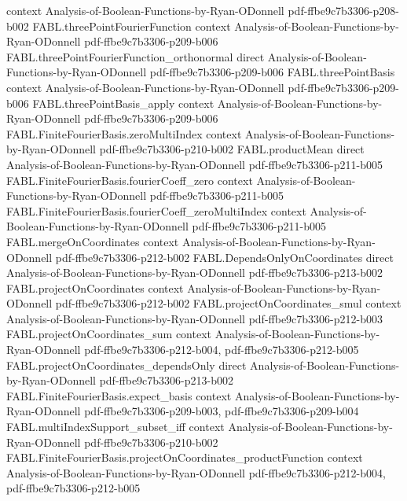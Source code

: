 \begin{theorem}
  {context}
  {Analysis-of-Boolean-Functions-by-Ryan-ODonnell}
  {pdf-ffbe9c7b3306-p208-b002}
\proofstep
  {FABL.threePointFourierFunction}
  {context}
  {Analysis-of-Boolean-Functions-by-Ryan-ODonnell}
  {pdf-ffbe9c7b3306-p209-b006}
\proofstep
  {FABL.threePointFourierFunction_orthonormal}
  {direct}
  {Analysis-of-Boolean-Functions-by-Ryan-ODonnell}
  {pdf-ffbe9c7b3306-p209-b006}
\proofstep
  {FABL.threePointBasis}
  {context}
  {Analysis-of-Boolean-Functions-by-Ryan-ODonnell}
  {pdf-ffbe9c7b3306-p209-b006}
\proofstep
  {FABL.threePointBasis_apply}
  {context}
  {Analysis-of-Boolean-Functions-by-Ryan-ODonnell}
  {pdf-ffbe9c7b3306-p209-b006}
\proofstep
  {FABL.FiniteFourierBasis.zeroMultiIndex}
  {context}
  {Analysis-of-Boolean-Functions-by-Ryan-ODonnell}
  {pdf-ffbe9c7b3306-p210-b002}
\proofstep
  {FABL.productMean}
  {direct}
  {Analysis-of-Boolean-Functions-by-Ryan-ODonnell}
  {pdf-ffbe9c7b3306-p211-b005}
\proofstep
  {FABL.FiniteFourierBasis.fourierCoeff_zero}
  {context}
  {Analysis-of-Boolean-Functions-by-Ryan-ODonnell}
  {pdf-ffbe9c7b3306-p211-b005}
\proofstep
  {FABL.FiniteFourierBasis.fourierCoeff_zeroMultiIndex}
  {context}
  {Analysis-of-Boolean-Functions-by-Ryan-ODonnell}
  {pdf-ffbe9c7b3306-p211-b005}
\proofstep
  {FABL.mergeOnCoordinates}
  {context}
  {Analysis-of-Boolean-Functions-by-Ryan-ODonnell}
  {pdf-ffbe9c7b3306-p212-b002}
\proofstep
  {FABL.DependsOnlyOnCoordinates}
  {direct}
  {Analysis-of-Boolean-Functions-by-Ryan-ODonnell}
  {pdf-ffbe9c7b3306-p213-b002}
\proofstep
  {FABL.projectOnCoordinates}
  {context}
  {Analysis-of-Boolean-Functions-by-Ryan-ODonnell}
  {pdf-ffbe9c7b3306-p212-b002}
\proofstep
  {FABL.projectOnCoordinates_smul}
  {context}
  {Analysis-of-Boolean-Functions-by-Ryan-ODonnell}
  {pdf-ffbe9c7b3306-p212-b003}
\proofstep
  {FABL.projectOnCoordinates_sum}
  {context}
  {Analysis-of-Boolean-Functions-by-Ryan-ODonnell}
  {pdf-ffbe9c7b3306-p212-b004,
    pdf-ffbe9c7b3306-p212-b005}
\proofstep
  {FABL.projectOnCoordinates_dependsOnly}
  {direct}
  {Analysis-of-Boolean-Functions-by-Ryan-ODonnell}
  {pdf-ffbe9c7b3306-p213-b002}
\proofstep
  {FABL.FiniteFourierBasis.expect_basis}
  {context}
  {Analysis-of-Boolean-Functions-by-Ryan-ODonnell}
  {pdf-ffbe9c7b3306-p209-b003,
    pdf-ffbe9c7b3306-p209-b004}
\proofstep
  {FABL.multiIndexSupport_subset_iff}
  {context}
  {Analysis-of-Boolean-Functions-by-Ryan-ODonnell}
  {pdf-ffbe9c7b3306-p210-b002}
\proofstep
  {FABL.FiniteFourierBasis.projectOnCoordinates_productFunction}
  {context}
  {Analysis-of-Boolean-Functions-by-Ryan-ODonnell}
  {pdf-ffbe9c7b3306-p212-b004,
    pdf-ffbe9c7b3306-p212-b005}

\end{theorem}
